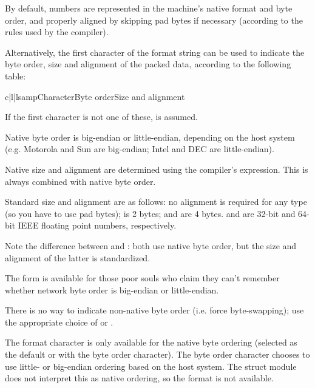 By default, \C{} numbers are represented in the machine's native format
and byte order, and properly aligned by skipping pad bytes if
necessary (according to the rules used by the \C{} compiler).

Alternatively, the first character of the format string can be used to
indicate the byte order, size and alignment of the packed data,
according to the following table:

\begin{tableiii}{c|l|l}{samp}{Character}{Byte order}{Size and alignment}
\end{tableiii}

If the first character is not one of these,  is assumed.

Native byte order is big-endian or little-endian, depending on the
host system (e.g. Motorola and Sun are big-endian; Intel and DEC are
little-endian).

Native size and alignment are determined using the \C{} compiler's
 expression.  This is always combined with native byte
order.

Standard size and alignment are as follows: no alignment is required
for any type (so you have to use pad bytes);  is 2 bytes;
 and  are 4 bytes.   and
 are 32-bit and 64-bit IEEE floating point numbers,
respectively.

Note the difference between  and \character{=}: both use
native byte order, but the size and alignment of the latter is
standardized.

The form \character{!} is available for those poor souls who claim they
can't remember whether network byte order is big-endian or
little-endian.

There is no way to indicate non-native byte order (i.e. force
byte-swapping); use the appropriate choice of \character{<} or
\character{>}.

The  format character is only available for the native
byte ordering (selected as the default or with the  byte
order character). The byte order character \character{=} chooses to
use little- or big-endian ordering based on the host system. The
struct module does not interpret this as native ordering, so the
 format is not available.

